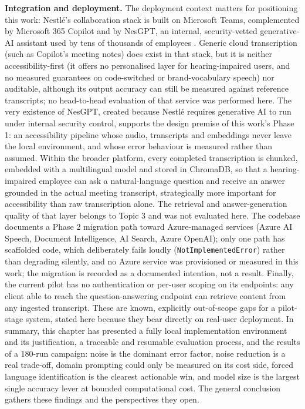 \documentclass[12pt]{report}
\begin{document}
\textbf{Integration and deployment.} The deployment context matters for positioning this work: Nestl\'e's collaboration stack is built on Microsoft Teams, complemented by Microsoft 365 Copilot and by NesGPT, an internal, security-vetted generative-AI assistant used by tens of thousands of employees \cite{worklife2024nesgpt,arec2023nestle}. Generic cloud transcription (such as Copilot's meeting notes) does exist in that stack, but it is neither accessibility-first (it offers no personalised layer for hearing-impaired users, and no measured guarantees on code-switched or brand-vocabulary speech) nor auditable, although its output accuracy can still be measured against reference transcripts; no head-to-head evaluation of that service was performed here. The very existence of NesGPT, created because Nestl\'e requires generative AI to run under internal security control, supports the design premise of this work's Phase 1: an accessibility pipeline whose audio, transcripts and embeddings never leave the local environment, and whose error behaviour is measured rather than assumed. Within the broader platform, every completed transcription is chunked, embedded with a multilingual model and stored in ChromaDB, so that a hearing-impaired employee can ask a natural-language question and receive an answer grounded in the actual meeting transcript, strategically more important for accessibility than raw transcription alone. The retrieval and answer-generation quality of that layer belongs to Topic 3 and was not evaluated here. The codebase documents a Phase 2 migration path toward Azure-managed services (Azure AI Speech, Document Intelligence, AI Search, Azure OpenAI); only one path has scaffolded code, which deliberately fails loudly (\texttt{NotImplementedError}) rather than degrading silently, and no Azure service was provisioned or measured in this work; the migration is recorded as a documented intention, not a result. Finally, the current pilot has no authentication or per-user scoping on its endpoints: any client able to reach the question-answering endpoint can retrieve content from any ingested transcript. These are known, explicitly out-of-scope gaps for a pilot-stage system, stated here because they bear directly on real-user deployment.
\vspace{0.5em}
In summary, this chapter has presented a fully local implementation environment and its justification, a traceable and resumable evaluation process, and the results of a 180-run campaign: noise is the dominant error factor, noise reduction is a real trade-off, domain prompting could only be measured on its cost side, forced language identification is the clearest actionable win, and model size is the largest single accuracy lever at bounded computational cost. The general conclusion gathers these findings and the perspectives they open.
\end{document}
